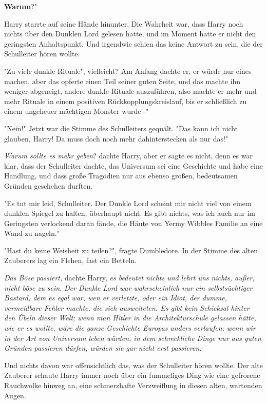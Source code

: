 {\textbf{Warum}?"

Harry starrte auf seine Hände hinunter. Die Wahrheit war, dass Harry noch nichts über den Dunklen Lord gelesen hatte, und im Moment hatte er nicht den geringsten Anhaltspunkt. Und irgendwie schien das keine Antwort zu sein, die der Schulleiter hören wollte.

"Zu viele dunkle Rituale", vielleicht? Am Anfang dachte er, er würde nur eines machen, aber das opferte einen Teil seiner guten Seite, und das machte ihn weniger abgeneigt, andere dunkle Rituale auszuführen, also machte er mehr und mehr Rituale in einem positiven Rückkopplungskreislauf, bis er schließlich zu einem ungeheuer mächtigen Monster wurde -"

"Nein!" Jetzt war die Stimme des Schulleiters gequält. "Das kann ich nicht glauben, Harry! Da muss doch noch mehr dahinterstecken als nur das!"

\emph{Warum sollte es mehr geben}? dachte Harry, aber er sagte es nicht, denn es war klar, dass der Schulleiter dachte, das Universum sei eine Geschichte und habe eine Handlung, und dass große Tragödien nur aus ebenso großen, bedeutsamen Gründen geschehen durften.

"Es tut mir leid, Schulleiter. Der Dunkle Lord scheint mir nicht viel von einem dunklen Spiegel zu halten, überhaupt nicht. Es gibt nichts, was ich auch nur im Geringsten verlockend daran fände, die Häute von Yermy Wibbles Familie an eine Wand zu nageln."

"Hast du keine Weisheit zu teilen?", fragte Dumbledore. In der Stimme des alten Zauberers lag ein Flehen, fast ein Betteln.

\emph{Das Böse passiert,} dachte Harry, \emph{es bedeutet nichts und lehrt uns nichts, außer, nicht böse zu sein.} \emph{Der Dunkle Lord war wahrscheinlich nur ein selbstsüchtiger Bastard, dem es egal war, wen er verletzte, oder ein Idiot, der dumme, vermeidbare Fehler machte, die sich ausweiteten. Es gibt kein Schicksal hinter den Übeln dieser Welt; wenn man Hitler in die Architekturschule gelassen hätte, wie er es wollte, wäre die ganze Geschichte Europas anders verlaufen; wenn wir in der Art von Universum leben würden, in dem schreckliche Dinge nur aus guten Gründen passieren dürfen, würden sie gar nicht erst passieren.}

Und nichts davon war offensichtlich das, was der Schulleiter hören wollte. Der alte Zauberer schaute Harry immer noch über ein fummeliges Ding wie eine gefrorene Rauchwolke hinweg an, eine schmerzhafte Verzweiflung in diesen alten, wartenden Augen.

}

